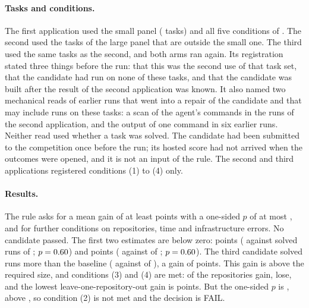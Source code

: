 \paragraph{Tasks and conditions.}
The first application used the small panel (\SGateOneTasks{} tasks) and all five conditions of . The
second used the \SGateTwoTasks{} tasks of the large panel that are outside the small one. The third used the same
\SGateThreeTasks{} tasks as the second, and both arms ran again. Its registration stated three things before the run:
that this was the second use of that task set, that the candidate had run on none of these tasks, and that the
candidate was built after the result of the second application was known. It also named two mechanical reads of
earlier runs that went into a repair of the candidate and that may include runs on these tasks: a scan of the
agent's commands in the \SGateTwoSessions{} runs of the second application, and the output of one command in six
earlier runs. Neither read used whether a task was solved. The candidate had been submitted to the competition
once before the run; its hosted score had not arrived when the outcomes were opened, and it is not an input of the
rule. The second and third applications registered conditions (1) to (4) only.

\paragraph{Results.}
The rule asks for a mean gain of at least \SGateMinGain{} points with a one-sided $p$ of at most \SGateAlpha, and for
further conditions on repositories, time and infrastructure errors. No candidate passed. The first two estimates are
below zero: \SGateOneGain{} points (\SGateOneCand{} against \SGateOneBase{} solved runs of \SGateOneRuns; $p =
0.60$) and \SGateTwoGain{} points (\SGateTwoCand{} against \SGateTwoBase{} of \SGateTwoRuns; $p = 0.60$).
The third candidate solved \SGateThreeMore{} runs more than the baseline (\SGateThreeCand{} against \SGateThreeBase{}
of \SGateThreeRuns), a gain of \SGateThreeGain{} points. This gain is above the required size, and conditions (3) and
(4) are met: \SGateThreeReposUp{} of the \SGateThreeRepos{} repositories gain, \SGateThreeReposDown{} lose, and the
lowest leave-one-repository-out gain is \SGateThreeLoo{} points. But the one-sided $p$ is \SGateThreeP, above
\SGateAlpha, so condition (2) is not met and the decision is FAIL.


